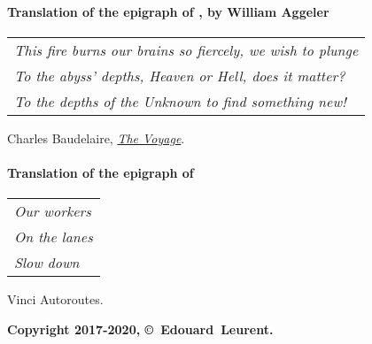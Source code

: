 \paragraph{Translation of the epigraph of , by William Aggeler}

\begin{flushright}
	\begin{tabular}{@{}l@{}}
		\emph{This fire burns our brains so fiercely, we wish to plunge}\\
		\emph{To the abyss' depths, Heaven or Hell, does it matter?}\\
		\emph{To the depths of the Unknown to find something new!}\\
	\end{tabular}
	
	Charles Baudelaire, \href{https://fleursdumal.org/poem/231}{\emph{The Voyage}}.
\end{flushright}

\paragraph{Translation of the epigraph of }

\begin{flushright}
	\begin{tabular}{@{}l@{}}
		\emph{Our workers}\\
		\emph{\hspace*{1.0cm}On the lanes}\\
		\emph{\hspace*{0.5cm}Slow down}\\
	\end{tabular}
	
	Vinci Autoroutes.\hspace*{1cm}
\end{flushright}


\hr{}

\begin{center}
	\textbf{Copyright 2017-2020, \copyright ~Edouard~Leurent.}
\end{center}

